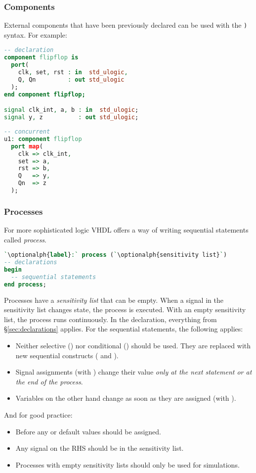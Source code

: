 \subsubsection{Components}
External components that have been previously declared can be used with the
\texttt{)} syntax. For example:
\begin{lstlisting}[language=vhdl]
-- declaration
component flipflop is
  port(
    clk, set, rst : in  std_ulogic,
    Q, Qn         : out std_ulogic 
  );
end component flipflop;

signal clk_int, a, b : in  std_ulogic;
signal y, z          : out std_ulogic;
\end{lstlisting}
\begin{lstlisting}[language=vhdl]
-- concurrent
u1: component flipflop
  port map(
    clk => clk_int,
    set => a,
    rst => b,
    Q   => y,
    Qn  => z
  );

\end{lstlisting}

\subsubsection{Processes}
For more sophisticated logic VHDL offers a way of writing sequential statements
called \emph{process}.
\begin{lstlisting}[language=vhdl]
`\optionalph{label}:` process (`\optionalph{sensitivity list}`)
-- declarations
begin
  -- sequential statements
end process;
\end{lstlisting}
Processes have a \emph{sensitivity list} that can be empty.  When a signal in
the sensitivity list changes state, the process is executed.  With an empty
sensitivity list, the process runs continuously.  In the declaration,
everything from \S\ref{sec:declarations} applies. For the sequential
statements, the following applies:
\begin{itemize}
  \item Neither selective () nor conditional () should be used.
    They are replaced with new sequential constructs ( and ).
  \item Signal assignments (with \vhdl{<=}) change their value
    \emph{only at the next}  \emph{statement or at the end of the process}.
  \item Variables on the other hand change as soon as they are assigned (with \vhdl{:=}).
\end{itemize}
And for good practice:
\begin{itemize}
  \item Before any  or  default values should be assigned.
  \item Any signal on the RHS should be in the sensitivity list.
  \item Processes with empty sensitivity lists should only be used for simulations.
\end{itemize}

